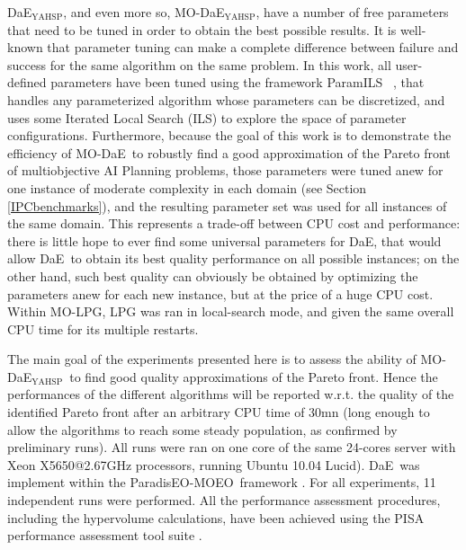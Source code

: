 \documentclass{article}
\def\DAE{{\sc DaE}}
\newcommand{\DAEYAHSP}{{\sc DaE$_{\text{YAHSP}}$}}
\def\PARADISEO{{\sc ParadisEO-MOEO}}
\def\MODAE{{\sc MO-DaE}}
\newcommand{\MODAEYAHSP}{{\sc MO-DaE$_{\text{YAHSP}}$}}
\newcommand{\MOLPG}{{\sc MO-LPG}}
\def\PARAMILS{{\sc ParamILS}}
\begin{document}
\DAEYAHSP, and even more so, \MODAEYAHSP, have a number of free parameters that need to be tuned in order to obtain the best possible results. It is well-known that parameter tuning can make a complete difference between failure and success for the same algorithm on the same problem. In this work, all user-defined parameters have been tuned using the  framework \PARAMILS\
\cite{ParamILS-JAIR}, that handles any parameterized algorithm whose parameters can be discretized, and uses some Iterated Local Search (ILS) to explore the space of parameter configurations.
Furthermore, because the goal of this work is to demonstrate the efficiency of \MODAE\ to robustly find a good approximation of the Pareto front of multiobjective AI Planning problems, those parameters were tuned anew for one instance of moderate complexity in each domain (see Section \ref{IPCbenchmarks}), and the resulting parameter set was used for all instances of the same domain. This represents a trade-off between CPU cost and performance: there is little hope to ever find some universal parameters for \DAE, that would allow \DAE\ to obtain its best quality performance on all possible instances; on the other hand, such best quality can obviously be obtained by optimizing the parameters anew for each new instance, but at the price of a huge CPU cost. Within \MOLPG, LPG was ran in local-search mode, and given the same overall CPU time for its multiple restarts.


The main goal of the experiments presented here is to assess the ability of \MODAEYAHSP\ to find good quality approximations of the Pareto front. Hence the performances of the different algorithms will be reported w.r.t. the quality of the identified Pareto front after an arbitrary CPU time of 30mn (long enough to allow the algorithms to reach some steady population, as confirmed by preliminary runs). All runs were ran on one core of the same 24-cores server with Xeon X5650@2.67GHz processors, running Ubuntu 10.04 Lucid).
\DAE\ was implement within the \PARADISEO\ framework \cite{paradiseo}. For all experiments, 11 independent runs were performed. All the performance assessment procedures, including the hypervolume calculations, have been achieved using the PISA performance assessment tool suite \cite{Bleuler2003}. %
\end{document}
